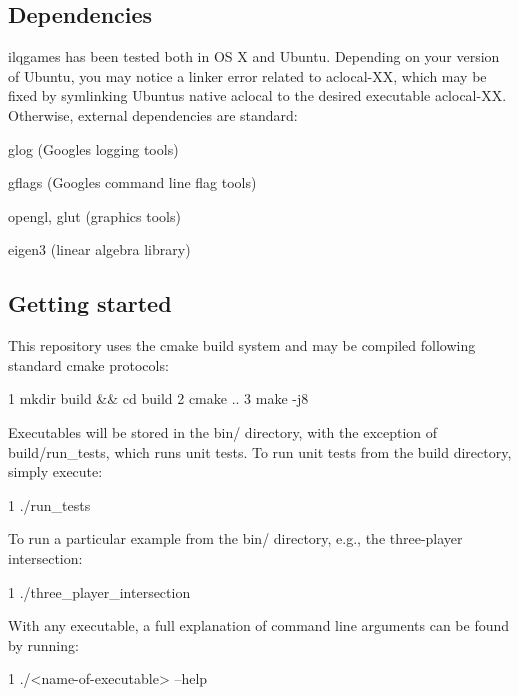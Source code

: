 \subsection*{Dependencies}

{\ttfamily ilqgames} has been tested both in OS X and Ubuntu. Depending on your version of Ubuntu, you may notice a linker error related to {\ttfamily aclocal-\/\+XX}, which may be fixed by symlinking Ubuntu\textquotesingle{}s native {\ttfamily aclocal} to the desired executable {\ttfamily aclocal-\/\+XX}. Otherwise, external dependencies are standard\+:


\begin{DoxyItemize}
\item {\ttfamily glog} (Google\textquotesingle{}s logging tools)
\item {\ttfamily gflags} (Google\textquotesingle{}s command line flag tools)
\item {\ttfamily opengl}, {\ttfamily glut} (graphics tools)
\item {\ttfamily eigen3} (linear algebra library)
\end{DoxyItemize}

\subsection*{Getting started}

This repository uses the {\ttfamily cmake} build system and may be compiled following standard cmake protocols\+: 
\begin{DoxyCode}
1 mkdir build && cd build
2 cmake ..
3 make -j8
\end{DoxyCode}


Executables will be stored in the {\ttfamily bin/} directory, with the exception of {\ttfamily build/run\+\_\+tests}, which runs unit tests. To run unit tests from the build directory, simply execute\+: 
\begin{DoxyCode}
1 ./run\_tests
\end{DoxyCode}


To run a particular example from the {\ttfamily bin/} directory, e.\+g., the three-\/player intersection\+: 
\begin{DoxyCode}
1 ./three\_player\_intersection
\end{DoxyCode}


With any executable, a full explanation of command line arguments can be found by running\+: 
\begin{DoxyCode}
1 ./<name-of-executable> --help
\end{DoxyCode}


